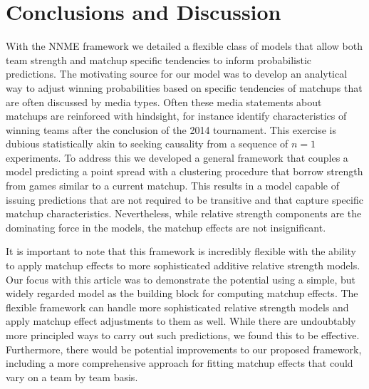 \documentclass[letterpaper,12pt]{article}
\begin{document}
\section{Conclusions and Discussion}
With the NNME framework we detailed a flexible class of models that allow both team strength and matchup specific tendencies to inform probabilistic predictions. The motivating source for our model was to develop an analytical way to adjust winning probabilities based on specific tendencies of matchups that are often discussed by media types. Often these media statements about matchups are reinforced with hindsight, for instance identify characteristics of winning teams after the conclusion of the 2014 tournament. This exercise is dubious statistically akin to seeking causality from a sequence of $n=1$ experiments. To address this we developed a general framework that couples a model predicting a point spread with a clustering procedure that borrow strength from games similar to a current matchup. This results in a model capable of issuing predictions that are not required to be transitive and that capture specific matchup characteristics. Nevertheless, while relative strength components are the dominating force in the models, the matchup effects are not insignificant. 

It is important to note that this framework is incredibly flexible with the ability to apply matchup effects to more sophisticated additive relative strength models. Our focus with this article was to demonstrate the potential using a simple, but widely regarded model as the building block for computing matchup effects. The flexible framework can handle more sophisticated relative strength models and apply matchup effect adjustments to them as well. While there are undoubtably more principled ways to carry out such predictions, we found this to be effective. Furthermore, there would be potential improvements to our proposed framework, including a more comprehensive approach for fitting matchup effects that could vary on a team by team basis.


\end{document}
